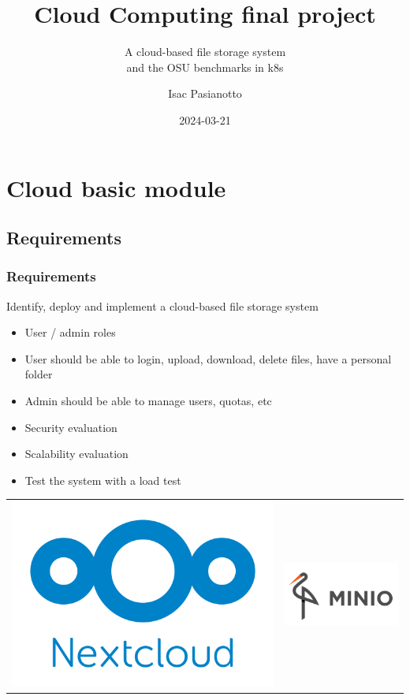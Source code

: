 \documentclass{beamer}
\author{}
\subtitle{}
\title{\insertsection}
\date{}
\title[Cloud Computing final project]{\Huge{Cloud Computing final project}}
\subtitle{A cloud-based file storage system \\ and the OSU benchmarks in k8s}
\author{Isac Pasianotto}
\date{2024-03-21}
\begin{document}
\begin{frame}
    \titlepage
\end{frame}


\section{Cloud \textbf{basic} module}
\subsection{Requirements}

\begin{frame}
    \frametitle{Requirements}
    Identify, deploy and implement a cloud-based file storage system
    \begin{itemize}
        \item User / admin roles
        \item User should be able to login, upload, download, delete files, have a personal folder
        \item Admin should be able to manage users, quotas, etc
        \item Security evaluation
        \item Scalability evaluation
        \item Test the system with a load test
    \end{itemize}
    \begin{center}
        \begin{tabular}{cc}
            \includegraphics[height=0.2\textheight]{images/other/nextcloud-logo-extended} & \includegraphics[height=0.2\textheight]{images/other/minIO-logo}

\end{tabular}
\end{center}
\end{frame}
\end{document}
